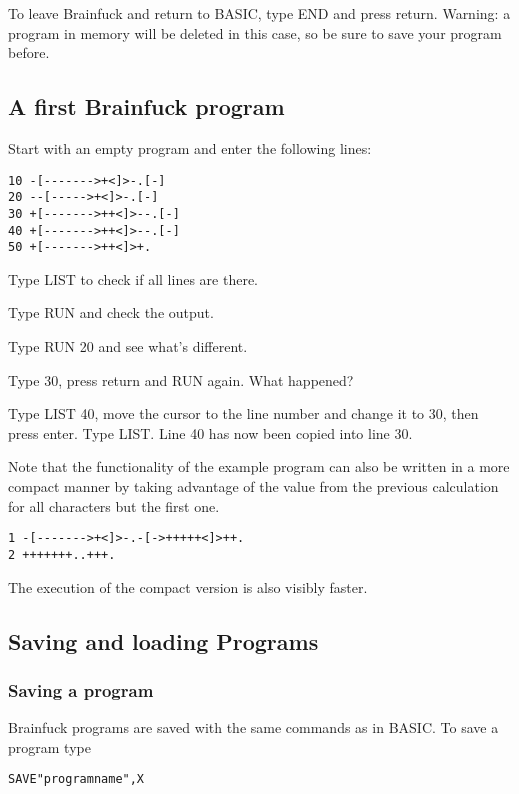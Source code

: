 \documentclass[ms,article,a4paper]{memoir}
\begin{document}
To leave Brainfuck and return to BASIC, type END and press return. Warning: a program in memory will be deleted in this case, so be sure to save your program before.

\subsection{A first Brainfuck program}

Start with an empty program and enter the following lines:

\begin{verbatim}
10 -[------->+<]>-.[-]
20 --[----->+<]>-.[-]
30 +[------->++<]>--.[-]
40 +[------->++<]>--.[-]
50 +[------->++<]>+.    
\end{verbatim}

Type LIST to check if all lines are there.

Type RUN and check the output.

Type RUN 20 and see what's different.

Type 30, press return and RUN again. What happened?

Type LIST 40, move the cursor to the line number and change it to 30, then press enter. Type LIST. Line 40 has now been copied into line 30.

Note that the functionality of the example program can also be written in a more compact manner by taking advantage of the value from the previous calculation for all characters but the first one.

\begin{verbatim}
1 -[------->+<]>-.-[->+++++<]>++.
2 +++++++..+++.
\end{verbatim}

The execution of the compact version is also visibly faster.

\subsection{Saving and loading Programs}

\subsubsection{Saving a program}

Brainfuck programs are saved with the same commands as in BASIC. To save a program type

\begin{verbatim}
SAVE"programname",X
\end{verbatim}
\end{document}
